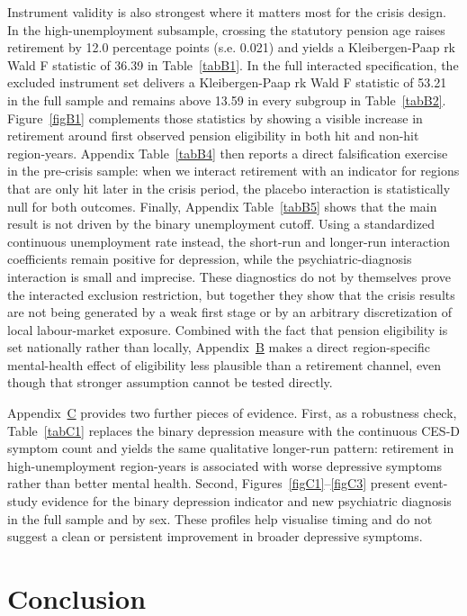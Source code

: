\documentclass[arguments, manuscript, 11pt]{aastex631}
\begin{document}
Instrument validity is also strongest where it matters most for the crisis design. In the high-unemployment subsample, crossing the statutory pension age raises retirement by 12.0 percentage points (s.e. 0.021) and yields a Kleibergen-Paap rk Wald F statistic of 36.39 in Table~\ref{tabB1}. In the full interacted specification, the excluded instrument set delivers a Kleibergen-Paap rk Wald F statistic of 53.21 in the full sample and remains above 13.59 in every subgroup in Table~\ref{tabB2}. Figure~\ref{figB1} complements those statistics by showing a visible increase in retirement around first observed pension eligibility in both hit and non-hit region-years. Appendix Table~\ref{tabB4} then reports a direct falsification exercise in the pre-crisis sample: when we interact retirement with an indicator for regions that are only hit later in the crisis period, the placebo interaction is statistically null for both outcomes. Finally, Appendix Table~\ref{tabB5} shows that the main result is not driven by the binary unemployment cutoff. Using a standardized continuous unemployment rate instead, the short-run and longer-run interaction coefficients remain positive for depression, while the psychiatric-diagnosis interaction is small and imprecise. These diagnostics do not by themselves prove the interacted exclusion restriction, but together they show that the crisis results are not being generated by a weak first stage or by an arbitrary discretization of local labour-market exposure. Combined with the fact that pension eligibility is set nationally rather than locally, Appendix~\hyperref[sec:appendixB]{B} makes a direct region-specific mental-health effect of eligibility less plausible than a retirement channel, even though that stronger assumption cannot be tested directly.

Appendix~\hyperref[sec:appendixC]{C} provides two further pieces of evidence. First, as a robustness check, Table~\ref{tabC1} replaces the binary depression measure with the continuous CES-D symptom count and yields the same qualitative longer-run pattern: retirement in high-unemployment region-years is associated with worse depressive symptoms rather than better mental health. Second, Figures~\ref{figC1}--\ref{figC3} present event-study evidence for the binary depression indicator and new psychiatric diagnosis in the full sample and by sex. These profiles help visualise timing and do not suggest a clean or persistent improvement in broader depressive symptoms.

\section{Conclusion} \label{sec:discussion}
\end{document}
